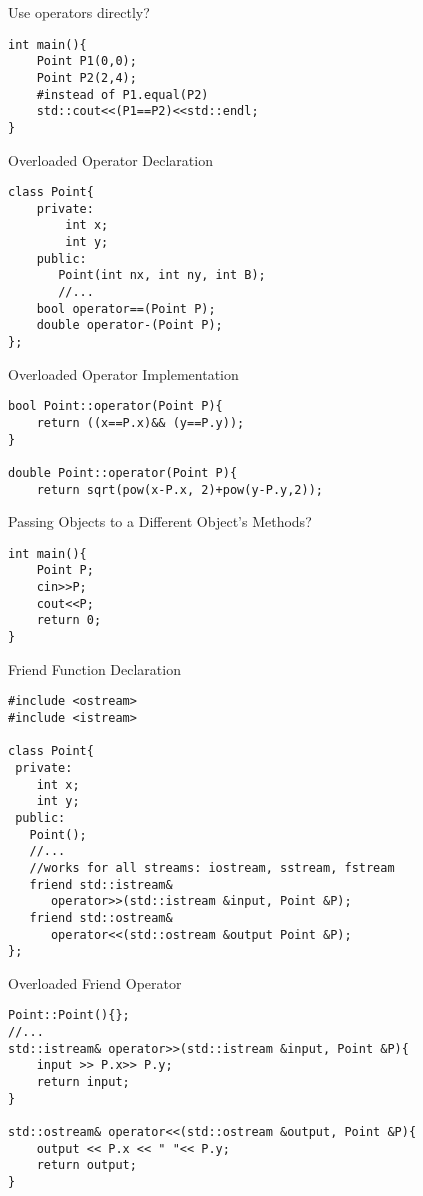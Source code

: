 \documentclass[xcolor={dvipsnames}]{beamer}
\begin{document}
\begin{frame}[fragile]{Use operators directly?}
\begin{verbatim}
int main(){
    Point P1(0,0);
    Point P2(2,4);
    #instead of P1.equal(P2)
    std::cout<<(P1==P2)<<std::endl;
}
\end{verbatim}
\end{frame}


\begin{frame}[fragile]{Overloaded Operator Declaration}
\begin{verbatim}
class Point{
    private:
        int x;
        int y;
    public:
       Point(int nx, int ny, int B);
       //...
    bool operator==(Point P);
    double operator-(Point P); 
};
\end{verbatim}
\end{frame}

\begin{frame}[fragile]{Overloaded Operator Implementation}
\begin{verbatim}
bool Point::operator(Point P){
    return ((x==P.x)&& (y==P.y));
}

double Point::operator(Point P){
    return sqrt(pow(x-P.x, 2)+pow(y-P.y,2));
\end{verbatim}
\end{frame}


\begin{frame}[fragile]{Passing Objects to a Different Object's Methods?}
\begin{verbatim}
int main(){
    Point P;
    cin>>P;
    cout<<P;
    return 0;
}
\end{verbatim}
\end{frame}



\begin{frame}[fragile]{Friend Function Declaration}
\begin{verbatim}
#include <ostream>
#include <istream>
 
class Point{
 private:
    int x;
    int y;
 public:
   Point();
   //...
   //works for all streams: iostream, sstream, fstream 
   friend std::istream& 
      operator>>(std::istream &input, Point &P);
   friend std::ostream& 
      operator<<(std::ostream &output Point &P);
};

\end{verbatim}
\end{frame}

\begin{frame}[fragile]{Overloaded Friend Operator}
\begin{verbatim}
Point::Point(){};
//...
std::istream& operator>>(std::istream &input, Point &P){
    input >> P.x>> P.y;
    return input;
}

std::ostream& operator<<(std::ostream &output, Point &P){
    output << P.x << " "<< P.y;
    return output;
}
\end{verbatim}
\end{frame}
\end{document}
